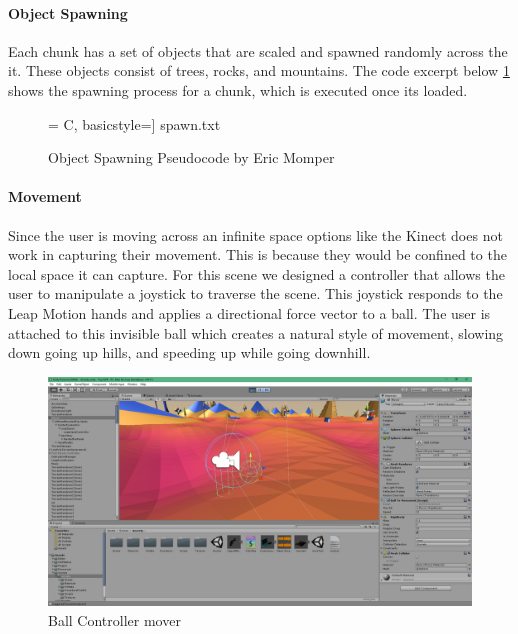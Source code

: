 \documentclass[a4paper,10pt]{article}
\begin{document}
\pagebreak


\paragraph{Object Spawning}
Each chunk has a set of objects that are scaled and spawned randomly across the it. These objects consist of trees, rocks, and mountains. The code excerpt below \ref{code:spawnCode} shows the spawning process for a chunk, which is executed once its loaded. 
\begin{figure}[H]
	\centerline{ = C, basicstyle=\small] {spawn.txt}}
	\label{code:spawnCode}
	\caption{Object Spawning Pseudocode by Eric Momper}
\end{figure}

\pagebreak
\paragraph{Movement}
Since the user is moving across an infinite space options like the Kinect does not work in capturing their movement. This is because they would be confined to the local space it can capture. For this scene we designed a controller that allows the user to manipulate a joystick to traverse the scene. This joystick responds to the Leap Motion hands and applies a directional force vector to a ball. The user is attached to this invisible ball which creates a natural style of movement, slowing down going up hills, and speeding up while going downhill. 
	\begin{figure}[H]
	\centerline{\includegraphics[width=\linewidth,height=\paperheight,keepaspectratio]{mover.png}}
	\caption{Ball Controller mover}
	\label{fig:moveTerrain2}
	\end{figure}
\end{document}
